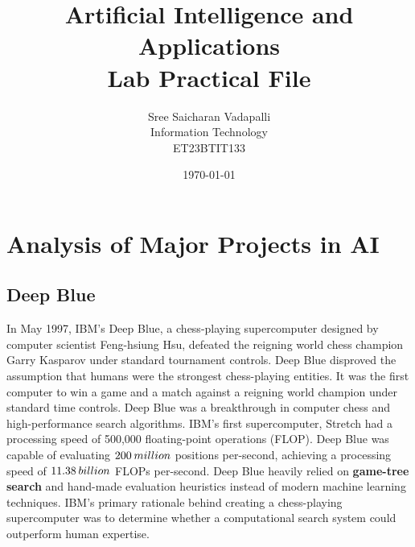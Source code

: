 \documentclass[11pt,a4paper]{report}
\begin{document}
\title{\Huge Artificial Intelligence and Applications \\ Lab Practical File}
\author{\Large Sree Saicharan Vadapalli \\ Information Technology \\ ET23BTIT133}
\date{\today}
\maketitle
\newpage

\tableofcontents
\newpage

\renewcommand{\chaptername}{Practical}

\chapter{Analysis of Major Projects in AI}

\section{Deep Blue}
In May 1997, IBM's Deep Blue, a chess-playing supercomputer designed by computer scientist Feng-hsiung Hsu, defeated the reigning
world chess champion Garry Kasparov under standard tournament controls. Deep Blue disproved the assumption that humans were the
strongest chess-playing entities. It was the first computer to win a game and a match against a reigning world champion under
standard time controls. Deep Blue was a breakthrough in computer chess and high-performance search algorithms. IBM's first supercomputer, Stretch
had a processing speed of 500,000 floating-point operations (FLOP). Deep Blue was capable of evaluating $200 \hspace{0.2em} million$ positions per-second,
achieving a processing speed of $11.38 \hspace{0.2em} billion$ FLOPs per-second.
Deep Blue heavily relied on \textbf{game-tree search} and hand-made evaluation heuristics instead of modern machine learning techniques. IBM's primary rationale
behind creating a chess-playing supercomputer was to determine whether a computational search system could outperform human expertise.
\end{document}

